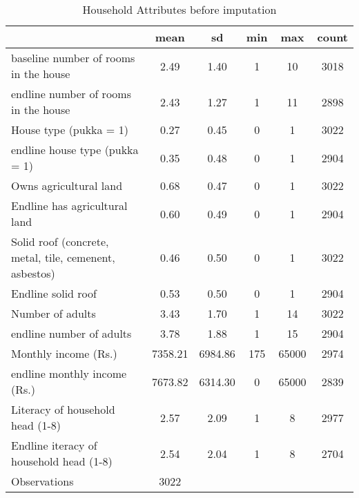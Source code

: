\begin{table}[htbp]\centering
\def\sym#1{\ifmmode^{#1}\else\(^{#1}\)\fi}
\caption{Household Attributes before imputation\label {tab1}}
\begin{tabular}{l*{1}{ccccc}}
\toprule
                    &        mean&          sd&         min&         max&       count\\
\midrule
baseline number of rooms in the house&        2.49&        1.40&           1&          10&        3018\\
endline number of rooms in the house&        2.43&        1.27&           1&          11&        2898\\
House type (pukka = 1)&        0.27&        0.45&           0&           1&        3022\\
endline house type (pukka = 1)&        0.35&        0.48&           0&           1&        2904\\
Owns agricultural land&        0.68&        0.47&           0&           1&        3022\\
Endline has agricultural land&        0.60&        0.49&           0&           1&        2904\\
Solid roof (concrete, metal, tile, cemenent, asbestos)&        0.46&        0.50&           0&           1&        3022\\
Endline solid roof  &        0.53&        0.50&           0&           1&        2904\\
Number of adults    &        3.43&        1.70&           1&          14&        3022\\
endline number of adults&        3.78&        1.88&           1&          15&        2904\\
Monthly income (Rs.)&     7358.21&     6984.86&         175&       65000&        2974\\
endline monthly income (Rs.)&     7673.82&     6314.30&           0&       65000&        2839\\
Literacy of household head (1-8)&        2.57&        2.09&           1&           8&        2977\\
Endline iteracy of household head (1-8)&        2.54&        2.04&           1&           8&        2704\\
\midrule
Observations        &        3022&            &            &            &            \\
\bottomrule
\end{tabular}
\end{table}
